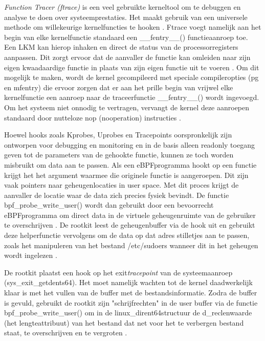 \emph{Function Tracer (ftrace)} is een veel gebruikte kerneltool om te debuggen en analyse te doen over systeemprestaties. Het maakt gebruik van een universele methode om willekeurige kernelfuncties te hooken \autocite{NAGY2025301928}. Ftrace voegt namelijk aan het begin van elke kernelfunctie standaard een \_\_fentry\_\_() functieaanroep toe. Een LKM kan hierop inhaken en direct de status van de processorregisters aanpassen. Dit zorgt ervoor dat de aanvaller de functie kan omleiden naar zijn eigen kwaadaardige functie in plaats van zijn eigen functie uit te voeren \autocite{Apriorit2022}. Om dit mogelijk te maken, wordt de kernel gecompileerd met speciale compiler\-opties (\-pg en \-mfentry) die ervoor zorgen dat er aan het prille begin van vrijwel elke kernelfunctie een aanroep naar de traceerfunctie \_\_fentry\_\_() wordt ingevoegd. Om het systeem niet onnodig te vertragen, vervangt de kernel deze aanroepen standaard door nutteloze nop (no\-operation) instructies \autocite{Apriorit2022}.

Hoewel hooks zoals Kprobes, Uprobes en Tracepoints oorspronkelijk zijn ontworpen voor debugging en monitoring en in de basis alleen read\-only toegang geven tot de parameters van de gehookte functie, kunnen ze toch worden misbruikt om data aan te passen. Als een eBPF\-programma hookt op een functie krijgt het het argument waarmee die originele functie is aangeroepen. Dit zijn vaak pointers naar geheugenlocaties in user space. Met dit proces krijgt de aanvaller de locatie waar de data zich precies fysiek bevindt. De functie bpf\_probe\_write\_user() wordt dan gebruikt door een bevoorrecht eBPF\-programma om direct data in de virtuele geheugenruimte van de gebruiker te overschrijven \autocite{Heredia2021}. De rootkit leest de geheugenbuffer via de hook uit en gebruikt deze helper\-functie vervolgens om de data op dat adres stilletjes aan te passen, zoals het manipuleren van het bestand /etc/sudoers wanneer dit in het geheugen wordt ingelezen \autocite{zacharia-mansouri-2026-NReUKT}. 

De rootkit plaatst een hook op het exit\-\emph{tracepoint} van de systeemaanroep (sys\_exit\_getdents64). Het moet namelijk wachten tot de kernel daadwerkelijk klaar is met het vullen van de buffer met de bestandsinformatie.
Zodra de buffer is gevuld, gebruikt de rootkit zijn "schrijfrechten" in de user buffer via de functie bpf\_probe\_write\_user() om in de linux\_dirent64\-structuur de d\_reclen\-waarde (het lengte\-attribuut) van het bestand dat net voor het te verbergen bestand staat, te overschrijven en te vergroten \autocite{Heredia2021}.

